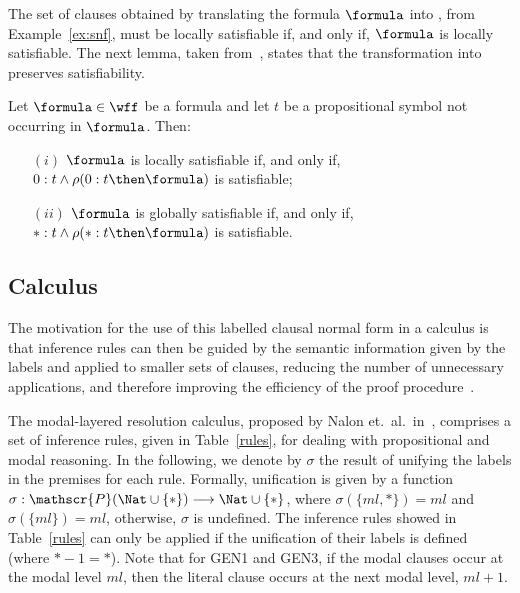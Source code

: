 The set of clauses obtained by translating the formula $\formula$ into
, from Example~\ref{ex:snf}, must be locally satisfiable if, and only
if, $\formula$ is locally satisfiable. The next lemma, taken
from~\cite{nalon2015modal}, states that the transformation into 
preserves satisfiability.

\begin{lemma}
    Let $\formula \in \wff$ be a formula and let $t$ be a propositional symbol
    not occurring in $\formula$. Then: 
    \begin{enumerate}
        \item[$(i)$] $\formula$ is locally satisfiable if, and only if, $0 : t \land \rho(0 : t \then \formula)$ is satisfiable;
        \item[$(ii)$] $\formula$ is globally satisfiable if, and only if, $* : t \land \rho(* : t \then \formula)$ is satisfiable.
    \end{enumerate}
\end{lemma}

\subsection{Calculus}

The motivation for the use of this labelled clausal normal form in a calculus is
that inference rules can then be guided by the semantic information given by the
labels and applied to smaller sets of clauses, reducing the number of
unnecessary applications, and therefore improving the efficiency of the proof
procedure~\cite{Nalon2016}. 

The modal-layered resolution calculus, proposed by Nalon et.\ al.\
in~\cite{nalon2015modal}, comprises a set of inference rules, given in
Table~\ref{rules}, for dealing with propositional and modal reasoning. In the
following, we denote by $\sigma$ the result of unifying the labels in the
premises for each rule.  Formally, unification is given by a function $ \sigma :
\mathscr{P}(\Nat \cup \{*\}) \longrightarrow \Nat \cup \{*\}$, where $\sigma
(\{ml, *\}) = ml$ and $\sigma (\{ml\}) = ml$, otherwise, $\sigma$ is undefined.
The inference rules showed in Table~\ref{rules} can only be applied if the
unification of their labels is defined (where $* - 1 = *$). Note that for GEN1
and GEN3, if the modal clauses occur at the modal level $ml$, then the literal
clause occurs at the next modal level, $ml + 1$.

